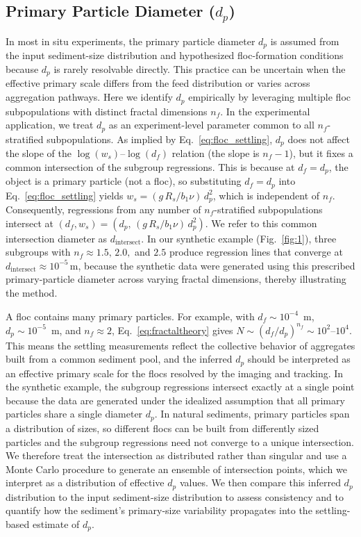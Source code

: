 \documentclass{agujournal2019}
\begin{document}
\subsection{Primary Particle Diameter ($d_p$)}

In most in situ experiments, the primary particle diameter \(d_p\) is assumed from the input sediment-size distribution and hypothesized floc-formation conditions because \(d_p\) is rarely resolvable directly. This practice can be uncertain when the effective primary scale differs from the feed distribution or varies across aggregation pathways. Here we identify \(d_p\) empirically by leveraging multiple floc subpopulations with distinct fractal dimensions \(n_f\). In the experimental application, we treat $d_p$ as an experiment-level parameter common to all $n_f$-stratified subpopulations. As implied by Eq.~\eqref{eq:floc_settling}, \(d_p\) does not affect the slope of the \(\log(w_s)\)--\(\log(d_f)\) relation (the slope is \(n_f-1\)), but it fixes a common intersection of the subgroup regressions. This is because at \(d_f=d_p\), the object is a primary particle (not a floc), so substituting \(d_f=d_p\) into Eq.~\eqref{eq:floc_settling} yields \(w_s=(g\,R_s/b_1\nu)\,d_p^{2}\), which is independent of \(n_f\). Consequently, regressions from any number of \(n_f\)-stratified subpopulations intersect at \((d_f, w_s)=(d_p,\,(g\,R_s/b_1\nu)\,d_p^{2})\). We refer to this common intersection diameter as $d_\text{intersect}$. In our synthetic example (Fig.~\ref{fig:1}), three subgroups with \(n_f \approx 1.5,\,2.0,\) and \(2.5\) produce regression lines that converge at \(d_\text{intersect} \approx 10^{-5}\,\mathrm{m}\), because the synthetic data were generated using this prescribed primary-particle diameter across varying fractal dimensions, thereby illustrating the method.


A floc contains many primary particles. For example, with $d_f \sim 10^{-4}$~m, $d_p \sim 10^{-5}$~m, and $n_f \approx 2$, Eq.~\eqref{eq:fractaltheory} gives $N \sim (d_f/d_p)^{n_f} \sim 10^{2}$–$10^{4}$. This means the settling measurements reflect the collective behavior of aggregates built from a common sediment pool, and the inferred $d_p$ should be interpreted as an effective primary scale for the flocs resolved by the imaging and tracking. In the synthetic example, the subgroup regressions intersect exactly at a single point because the data are generated under the idealized assumption that all primary particles share a single diameter $d_p$. In natural sediments, primary particles span a distribution of sizes, so different flocs can be built from differently sized particles and the subgroup regressions need not converge to a unique intersection. We therefore treat the intersection as distributed rather than singular and use a Monte Carlo procedure to generate an ensemble of intersection points, which we interpret as a distribution of effective $d_p$ values. We then compare this inferred $d_p$ distribution to the input sediment-size distribution to assess consistency and to quantify how the sediment’s primary-size variability propagates into the settling-based estimate of $d_p$.
\end{document}
